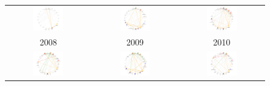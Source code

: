 \begin{figure}[H]
	\begin{tabular}{ccc}
		\includegraphics[width=0.38\textwidth]{Imagens/rede-exact-AL-2008.pdf} &   \includegraphics[width=0.38\textwidth]{Imagens/rede-exact-AL-2009.pdf} &
		\includegraphics[width=0.38\textwidth]{Imagens/rede-exact-AL-2010.pdf}\\
		2008 & 2009 & 2010\\[6pt] 
		\includegraphics[width=0.38\textwidth]{Imagens/rede-exact-AL-2011.pdf} &
		\includegraphics[width=0.38\textwidth]{Imagens/rede-exact-AL-2012.pdf} &   \includegraphics[width=0.38\textwidth]{Imagens/rede-exact-AL-2013.pdf} \\

\end{tabular}
\end{figure}
